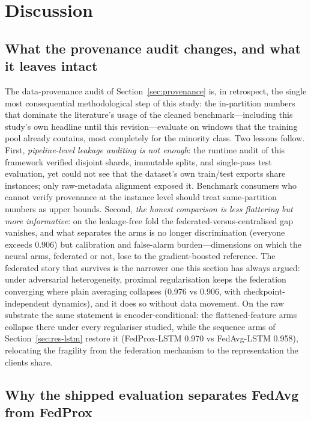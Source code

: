 \section{Discussion}\label{sec:discussion}

\subsection{What the provenance audit changes, and what it leaves intact}

The data-provenance audit of Section~\ref{sec:provenance} is, in
retrospect, the single most consequential methodological step of this
study: the in-partition numbers that dominate the literature's usage
of the cleaned benchmark---including this study's own headline until
this revision---evaluate on windows that the training pool already
contains, most completely for the minority class. Two lessons follow.
First, \emph{pipeline-level leakage auditing is not enough}: the
runtime audit of this framework verified disjoint shards, immutable
splits, and single-pass test evaluation, yet could not see that the
dataset's own train/test exports share instances; only raw-metadata
alignment exposed it. Benchmark consumers who cannot verify provenance
at the instance level should treat same-partition numbers as upper
bounds. Second, \emph{the honest comparison is less flattering but
more informative}: on the leakage-free fold the
federated-versus-centralised gap vanishes, and what separates the arms
is no longer discrimination (everyone exceeds 0.906) but calibration
and false-alarm burden---dimensions on which the neural arms,
federated or not, lose to the gradient-boosted reference. The
federated story that survives is the narrower one this section has
always argued: under adversarial heterogeneity, proximal
regularisation keeps the federation converging where plain averaging
collapses (0.976 vs 0.906, with checkpoint-independent dynamics),
and it does so without data movement. On the raw substrate the same
statement is encoder-conditional: the flattened-feature arms collapse
there under every regulariser studied, while the sequence arms of
Section~\ref{sec:res-lstm} restore it (FedProx-LSTM 0.970 vs
FedAvg-LSTM 0.958), relocating the fragility from the federation
mechanism to the representation the clients share.

\subsection{Why the shipped evaluation separates FedAvg from FedProx}

